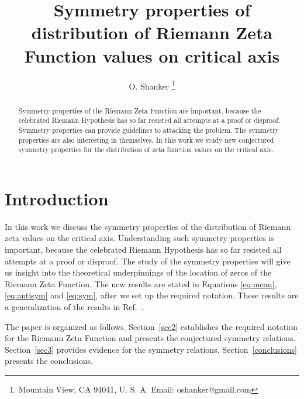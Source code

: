 \documentclass[twoside]{article}
\theoremstyle{definition}
\begin{document}
\date{}
\lhead[]{}
\chead[]{}
\rhead[]{}

\title{\bf{Symmetry properties of distribution of Riemann Zeta Function values on critical axis}}
%

\author{O. Shanker 
 \thanks{Mountain View, CA 94041, U. S. A. Email: oshanker@gmail.com
 }
}

\maketitle
\thispagestyle{fancy}

\begin{abstract}
Symmetry properties  of the Riemann Zeta Function are important, because the celebrated Riemann Hypothesis has so far
resisted all attempts at a proof or disproof. Symmetry properties can provide guidelines to attacking the problem. The symmetry
properties are also interesting in themselves. In this work we study new conjectured symmetry properties for the distribution
of zeta function values on the critical axis.
\end{abstract}



{}


\section{Introduction}
In this work we discuss the symmetry properties of the distribution of Riemann zeta values on the critical axis. 
Understanding such symmetry properties is important, because the celebrated Riemann Hypothesis has so far
resisted all attempts at a proof or disproof. The study of the symmetry properties  will give us insight into the theoretical underpinnings of the location of zeros of the Riemann Zeta Function.
The new results are stated in Equations \ref{eq:mean}, \ref{eq:antisym} and \ref{eq:sym}, after we set up the
required notation. These results are a generalization of the results in Ref.~\cite{Shanker 2018}. 

The paper is organized as follows.
Section~\ref{sec2} establishes the required notation for the 
Riemann Zeta Function and presents the conjectured symmetry relations. 
Section~\ref{sec3} provides evidence for the symmetry relations.
Section~\ref{conclusions} presents the conclusions.
\end{document}
